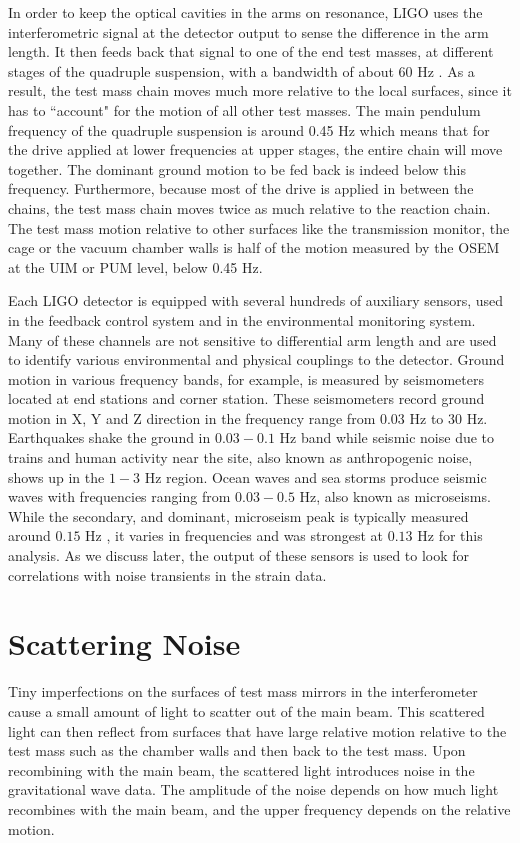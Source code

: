 \documentclass[12pt]{iopart}
\begin{document}
In order to keep the optical cavities in the arms on resonance, LIGO uses the interferometric signal at the detector output to sense the difference in the arm length. It then feeds back that signal to one of the end test masses, at different stages of the quadruple suspension, with a bandwidth of about 60 Hz \cite{Martynov_2016}. As a result, the test mass chain moves much more relative to the local surfaces, since it has to ``account" for the motion of all other test masses. The main pendulum frequency of the quadruple suspension is around 0.45 Hz which means that for the drive applied at lower frequencies at upper stages, the entire chain will move together. The dominant ground motion to be fed back is indeed below this frequency. Furthermore, because most of the drive is applied in between the chains, the test mass chain moves twice as much relative to the reaction chain. The test mass motion relative to other surfaces like the transmission monitor, the cage or the vacuum chamber walls is half of the motion measured by the OSEM at the UIM or PUM level, below 0.45 Hz.

Each LIGO detector is equipped with several hundreds of auxiliary sensors, used in the feedback control system and in the environmental monitoring system. Many of these channels are not sensitive to differential arm length and are used to identify various environmental and physical couplings to the detector.
Ground motion in various frequency bands, for example, is measured by seismometers located at end stations and corner station. These seismometers record ground motion in X, Y and Z direction in the frequency range from 0.03 Hz to 30 Hz. Earthquakes shake the ground in $0.03-0.1$ Hz band while seismic noise due to trains and human activity near the site, also known as anthropogenic noise, shows up in the $1-3$ Hz region. Ocean waves and sea storms produce seismic waves with frequencies ranging from $0.03-0.5$ Hz, also known as microseisms. While the secondary, and dominant, microseism peak is typically measured around $0.15$ Hz \cite{Cessaro1994SourcesOP,Effler_2015}, it varies in frequencies and was strongest at $0.13$ Hz for this analysis. As we discuss later, the output of these sensors is used to look for correlations with noise transients in the strain data.



 
\section{Scattering Noise}\label{scatteringnoise}
Tiny imperfections on the surfaces of test mass mirrors in the interferometer cause a small amount of light to scatter out of the main beam. This scattered light can then reflect from surfaces that have large relative motion relative to the test mass such as the chamber walls and then back to the test mass. Upon recombining with the main beam, the scattered light introduces noise in the gravitational wave data. The amplitude of the noise depends on how much light recombines with the main beam, and the upper frequency depends on the relative motion.
\end{document}
